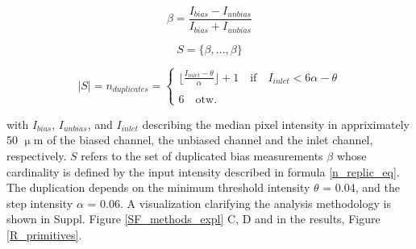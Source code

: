 \begin{equation}
    \beta = \frac{I_{bias}-I_{unbias}}{I_{bias}+I_{unbias}}
    \label{bias_eq}
\end{equation}

\begin{equation}
    S = \{\beta, \dots, \beta\}
    \label{replic_set_eq}
\end{equation}

\begin{equation}
    |S| = n_{duplicates} =  \begin{cases}
        \Big \lfloor \frac{I_{inlet}-\theta} {\alpha} \Big \rfloor +1   \quad \textrm{if}  \quad I_{inlet} < 6\alpha - \theta \\\\
        6  \quad\textrm{otw.}
    \label{n_replic_eq}
    \end{cases}
\end{equation}

with $I_{bias}$, $I_{unbias}$, and $I_{inlet}$  describing the median pixel
intensity in appriximately 50 $\upmu$m of the biased channel, the unbiased
channel and the inlet channel, respectively. $S$ refers to the set of duplicated
bias measurements $\beta$ whose cardinality is defined by the input intensity
described in formula \ref{n_replic_eq}. The duplication depends on the minimum
threshold intensity $\theta$ = 0.04, and the step intensity $\alpha$ = 0.06. A
visualization clarifying the analysis methodology is shown in Suppl. Figure
\ref{SF_methods_expl} C, D and in the results, Figure \ref{R_primitives}. \\











